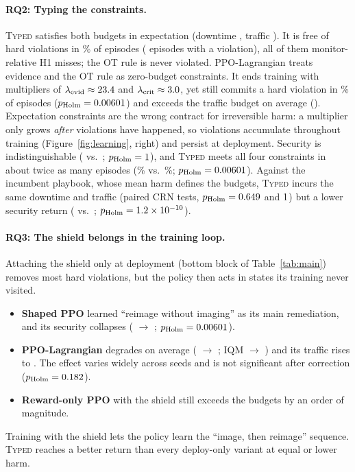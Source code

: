 \documentclass[10pt]{article}
\newcommand{\typed}{\textsc{Typed}}
\begin{document}
\paragraph{RQ2: Typing the constraints.}
\typed{} satisfies both budgets in expectation (downtime \resTrainTypedProd,
traffic \resTrainTypedTraf). It is free of hard violations in
\resTrainTypedHardFreePct\% of episodes (\nhardTrainTyped{} episodes with a
violation), all of them monitor-relative H1 misses; the OT rule is never
violated. PPO-Lagrangian treats evidence and the OT rule as zero-budget
constraints. It ends training with multipliers of
$\lambda_{\text{evid}}\approx23.4$ and
$\lambda_{\text{crit}}\approx3.0$, yet still commits a hard
violation in \resTrainLagHardFreePctViol\% of episodes
($p_{\text{Holm}}=0.00601$) and exceeds the traffic budget on
average (\resTrainLagTraf). Expectation constraints are the wrong contract
for irreversible harm: a multiplier only grows \emph{after} violations have
happened, so violations accumulate throughout training
(Figure~\ref{fig:learning}, right) and persist at deployment. Security is
indistinguishable (\resTrainTypedR{} vs.\ \resTrainLagR;
$p_{\text{Holm}}=1$), and \typed{} meets all four
constraints in about twice as many episodes (\resTrainTypedSatPct\% vs.\
\resTrainLagSatPct\%; $p_{\text{Holm}}=0.00601$). Against the
incumbent playbook, whose mean harm defines the budgets, \typed{} incurs the
same downtime and traffic (paired CRN tests,
$p_{\text{Holm}}=0.649$ and
$1$) but a lower security return
(\resTrainTypedR{} vs.\ \resTrainPlaybookR;
$p_{\text{Holm}}=1.2\times10^{-10}$).

\paragraph{RQ3: The shield belongs in the training loop.}
Attaching the shield only at deployment (bottom block of
Table~\ref{tab:main}) removes most hard violations, but the policy then acts
in states its training never visited.
\begin{itemize}
\item \textbf{Shaped PPO} learned ``reimage without imaging'' as its main
remediation, and its security collapses (\resTrainShapedR{} $\to$
\resTrainShapedDeployR; $p_{\text{Holm}}=0.00601$).
\item \textbf{PPO-Lagrangian} degrades on average (\resTrainLagR{} $\to$
\resTrainLagDeployR; IQM \resTrainLagRIqm{} $\to$ \resTrainLagDeployRIqm)
and its traffic rises to \resTrainLagDeployTraf. The effect varies widely
across seeds and is not significant after correction
($p_{\text{Holm}}=0.182$).
\item \textbf{Reward-only PPO} with the shield still exceeds the budgets by
an order of magnitude.
\end{itemize}
Training with the shield lets the policy learn the ``image, then reimage''
sequence. \typed{} reaches a better return than every deploy-only variant at
equal or lower harm.
\end{document}
